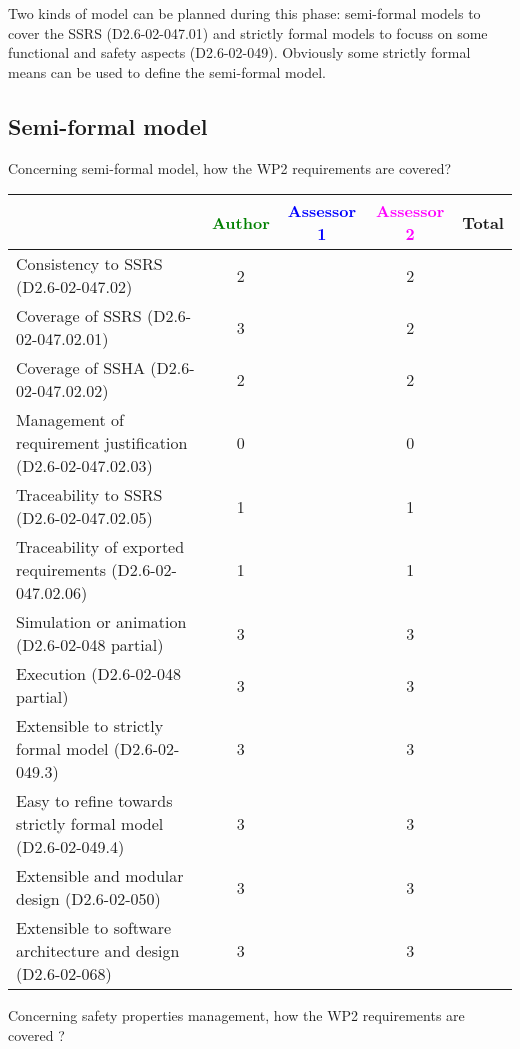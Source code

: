 Two kinds of model can be planned during this phase: semi-formal models to  cover the SSRS (D2.6-02-047.01) and strictly formal  models to  focuss on some functional and safety aspects (D2.6-02-049).  Obviously some strictly  formal means can be used to define the semi-formal  model.

\subsection{Semi-formal model}

Concerning semi-formal model, how the WP2 requirements are covered?

\begin{tabular}{|l | c | c | c | c|}
\hline
& \textcolor{green}{Author} & \textcolor{blue}{Assessor 1} & \textcolor{magenta}{Assessor 2} & Total \\
\hline 
Consistency to SSRS (D2.6-02-047.02) & 2 & & 2 &  \\
\hline
Coverage of SSRS (D2.6-02-047.02.01)  & 3 & & 2 &  \\
\hline
Coverage of SSHA (D2.6-02-047.02.02)  & 2 & & 2 &  \\
\hline
Management of requirement justification (D2.6-02-047.02.03)  & 0 & & 0 &  \\
\hline
Traceability to  SSRS (D2.6-02-047.02.05)  & 1 & & 1 &  \\
\hline
Traceability of exported requirements (D2.6-02-047.02.06)  & 1 & & 1 &  \\
\hline
Simulation or animation (D2.6-02-048 partial)  & 3 & & 3 &  \\
\hline
Execution (D2.6-02-048 partial)  & 3 & & 3 &  \\
\hline
Extensible to strictly formal model (D2.6-02-049.3) & 3 & & 3 &  \\
\hline
Easy to  refine towards strictly formal model (D2.6-02-049.4) & 3 & & 3 &  \\
\hline
Extensible and modular design (D2.6-02-050)  & 3 & & 3 &  \\
\hline
Extensible to software architecture and design (D2.6-02-068)   & 3 & & 3 &  \\
\hline
\end{tabular}

Concerning safety properties management, how the WP2 requirements are covered ?

